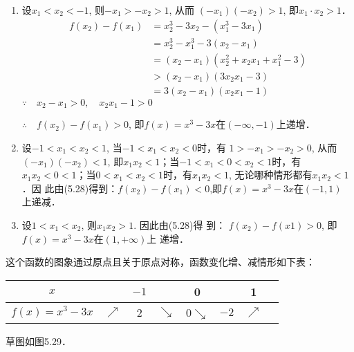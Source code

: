 \begin{solution}
\begin{enumerate}
    \item 
设$x_1<x_2<-1$, 则$-x_1>-x_2>1$, 从而
$(-x_1)(-x_2)>1$,  即$x_1\cdot x_2>1$．
\begin{equation}
    \begin{split}
    f(x_2)-f(x_1)&=x_2^3-3x_2-(x_1^3-3x_1)\\
    &= x_2^3-x_1^3-3(x_2-x_1)\\
&=(x_2-x_1)(x_2^2+x_2x_1+x_1^2-3)\\
&>(x_2-x_1)(3x_2x_1-3)\\
&=3(x_2-x_1)(x_2x_1-1)
\end{split}
\end{equation}
$\because\quad x_2-x_1>0,\quad x_2x_1-1>0$

$\therefore\quad f(x_2)-f(x_1)>0$, 即$f(x)=x^3-3x$在$(-\infty,-1)$上递增．

\item 设$-1<x_1<x_2<1$, 当$-1<x_1<x_2<0$时，有
$1>-x_1>-x_2>0$,  从而$(-x_1)(-x_2)<1$, 即$x_1x_2<
1$；当$-1<x_1<0<x_2<1$时，有$x_1x_2<0<1$；$当0<x_1
<x_2<1$时，有$x_1x_2<1$, 无论哪种情形都有$x_1x_2<1$．因
此由(5.28)得到：$f(x_2)-f(x_1)<0$,即$f(x)=x^3-3x$在$(-1,1)$
上递减．

\item 设$1<x_1<x_2$, 则$x_1x_2>1$. 因此由(5.28)得
到：
$f(x_2)-f(x1)>0$, 即$f(x)=x^3-3x$在$(1,+\infty)$上
递增．
\end{enumerate}

这个函数的图象通过原点且关于原点对称，函数变化增、减情形如下表：
\begin{center}
\begin{tabular}{c|ccccccc}
    \hline
    $x$    &&$-1$&& 0 && 1           \\
    \hline
    $f(x)=x^3-3x$& $\nearrow $&2&$\searrow $&0$\searrow $&$-2$&$\nearrow$\\
    \hline
\end{tabular}
\end{center}
    
\end{solution}
    
草图如图5.29．
\begin{figure}[htp]
    \centering
{}    
    \caption{}
\end{figure}

